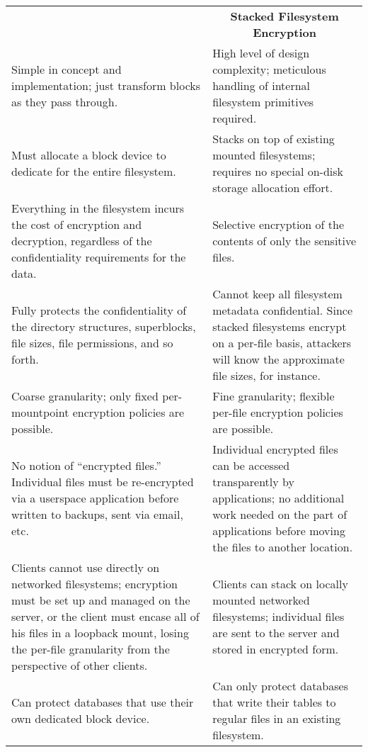 \renewcommand{\arraystretch}{1.8}
\begin{table}[tp]
	\begin{tabularx}{\textwidth}{|| m{} || m{} ||}
		\hhline{|t:=:t:=:t|}
		\multicolumn{1}{||c||}{\textbf{Block Device Encryption}} & 
			\multicolumn{1}{c||}{\textbf{Stacked Filesystem Encryption}} \\ 
		\hhline{|:=::=:|}
		Simple in concept and implementation; just transform blocks as they pass through. & High level of design complexity; meticulous handling of internal filesystem primitives required. \\
		\hhline{|:=::=:|}
		Must allocate a block device to dedicate for the entire filesystem. & Stacks on top of existing mounted filesystems; requires no special on-disk storage allocation effort. \\
		\hhline{|:=::=:|}
		Everything in the filesystem incurs the cost of encryption and decryption, regardless of the confidentiality requirements for the data. & Selective encryption of the contents of only the sensitive files. \\
		\hhline{|:=::=:|}
		Fully protects the confidentiality of the directory structures, superblocks, file sizes, file permissions, and so forth. & Cannot keep all filesystem metadata confidential. Since stacked filesystems encrypt on a per-file basis, attackers will know the approximate file sizes, for instance. \\
		\hhline{|:=::=:|}
		Coarse granularity; only fixed per-mountpoint encryption policies are possible. & Fine granularity; flexible per-file encryption policies are possible. \\
		\hhline{|:=::=:|}		
		No notion of ``encrypted files.'' Individual files must be re-encrypted via a userspace application before written to backups, sent via email, etc. & Individual encrypted files can be accessed transparently by applications; no additional work needed on the part of applications before moving the files to another location. \\
		\hhline{|:=::=:|}
		Clients cannot use directly on networked filesystems; encryption must be set up and managed on the server, or the client must encase all of his files in a loopback mount, losing the per-file granularity from the perspective of other clients. & Clients can stack on locally mounted networked filesystems; individual files are sent to the server and stored in encrypted form. \\
		\hhline{|:=::=:|}
		Can protect databases that use their own dedicated block device. & Can only protect databases that write their tables to regular files in an existing filesystem. \\

\end{tabularx}
\end{table}
